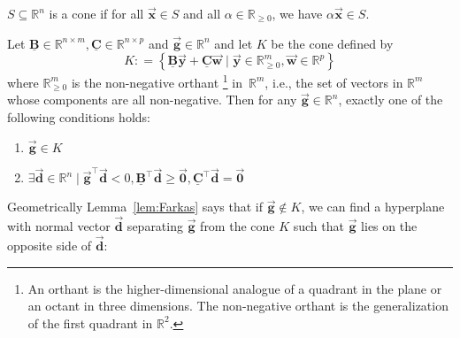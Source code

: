 \documentclass[9pt, headings=standardclasses, parskip=half]{scrartcl}
\renewcommand{\emph}[1]{\textcolor{mypurple}{#1}}
\newcommand{\matr}[1]{\underline{\boldsymbol{#1}}}
\newcommand{\vect}[1]{\vec{\boldsymbol{#1}}}
\newcommand{\R}{\mathbb{R}}
\begin{document}
\begin{definition}[Cone]\label{def:cone}
  \(S\subseteq\R^{n}\) is a \emph{cone} if for all \(\vect{x}\in S\) and all \(\alpha \in \R_{\ge 0}\), we have \(\alpha \vect{x} \in S\).
\end{definition}

\begin{lemma}[Farkas]\label{lem:Farkas}
  Let \( \matr{B}\in\R^{n\times m}, \matr{C}\in\R^{n\times p} \) and \( \vect{g}\in\R^{n} \) and let \(K\) be the cone defined by
  \begin{equation}\label{eq:cone_K}
  K : = \left\{ \matr{B} \vect{y} + \matr{C} \vect{w} \mid \vect{y} \in \R^m_{\ge 0}, \vect{w}\in\R^{p} \right\} 
\end{equation}
  where \(\R^m_{\ge 0}\) is the non-negative orthant%
  \footnote{An orthant is the higher-dimensional analogue of a quadrant in the plane or an octant in three dimensions. The non-negative orthant is the generalization of the first quadrant in \(\R^2\).}
  in~\( \R^m \), i.e., the set of vectors in \(\R^m\) whose components are all non-negative.
  Then for any \(\vect{g} \in \R^n\), exactly one of the following conditions holds:
  \begin{enumerate}[label=(\alph*)]
    \item \( \vect{g} \in K \) \label{item:Farkas_in_K}
    \item \( \exists \vect{d}\in\R^{n} \mid \vect{g}^{\top} \vect{d} < 0, \matr{B}^{\top} \vect{d} \ge \vect{0}, \matr{C}^{\top} \vect{d} = \vect{0} \) \qedhere\label{item:Farkas_hyperplane}
  \end{enumerate}
\end{lemma}
  Geometrically Lemma~\ref{lem:Farkas} says that if \(\vect{g} \notin K\), we can find a hyperplane with normal vector \(\vect{d}\) separating \(\vect{g}\) from the cone \(K\) such that \(\vect{g}\) lies on the opposite side of \(\vect{d}\):
\end{document}
